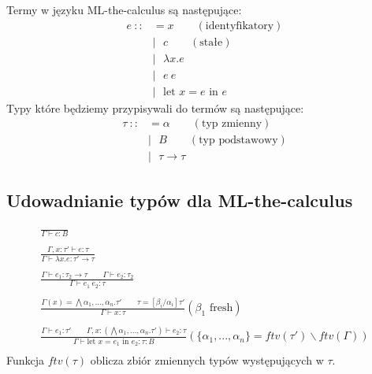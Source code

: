 \documentclass{article}
\begin{document}
Termy w języku ML-the-calculus są następujące:
\begin{equation}
  \begin{split}
    e\ ::&=x\qquad(\text{identyfikatory})\\
    &|\ \ \ c\qquad(\text{stałe})\\
    &|\ \ \ \lambda x.e\\
    &|\ \ \ e\ e\\
    &|\ \ \ \text{let }x=e\text{ in }e
  \end{split}
\end{equation}
Typy które będziemy przypisywali do termów są następujące:
\begin{equation}
  \begin{split}
    \tau\ ::&=\alpha\qquad(\text{typ zmienny})\\
    &|\ \ \ B\qquad(\text{typ podstawowy})\\
    &|\ \ \ \tau\rightarrow\tau
  \end{split}
\end{equation}
\subsection{Udowadnianie typów dla ML-the-calculus}

\begin{gather*}
    \frac{}{\Gamma\vdash c:B} \\
    \\
    \frac{\Gamma,x:\tau'\vdash e:\tau}{\Gamma\vdash\lambda x.e:\tau'\rightarrow\tau} \\
    \\
    \frac{\Gamma\vdash e_1:\tau_2\rightarrow\tau\qquad\Gamma\vdash e_2:\tau_2}{\Gamma\vdash e_1\ e_2:\tau} \\
    \\
    \frac{\Gamma(x)=\bigwedge\alpha_1,...,\alpha_n.\tau'\qquad\tau=[\beta_i/\alpha_i]\tau'}{\Gamma\vdash x:\tau}(\beta_1\text{ fresh}) \\
    \\
    \frac{\Gamma\vdash e_1:\tau'\qquad\Gamma,x:(\bigwedge\alpha_1,...,\alpha_n.\tau')\vdash e_2:\tau}{\Gamma\vdash \text{let }x=e_1\text{ in }e_2:\tau:B}(\{\alpha_1,...,\alpha_n\}=ftv(\tau')\backslash ftv(\Gamma)) \\
\end{gather*}
Funkcja $ftv(\tau)$ oblicza zbiór zmiennych typów występujących w $\tau$.
\end{document}
